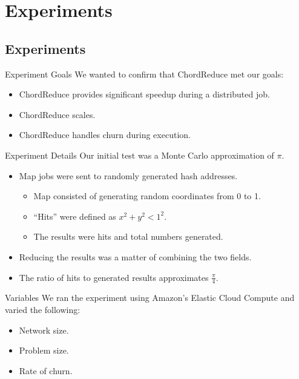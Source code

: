 \documentclass[11pt]{beamer}
\begin{document}
\section{Experiments}

\subsection{Experiments}
\begin{frame}{Experiment Goals}
We wanted to confirm that ChordReduce met our goals:

\begin{itemize}
    \item ChordReduce provides significant speedup during a distributed job.
    \item ChordReduce scales.
    \item ChordReduce handles churn during execution.
\end{itemize}

\end{frame}


\begin{frame}{Experiment Details}
Our initial test was a Monte Carlo approximation of $\pi$.

\begin{itemize}
	\item Map jobs were sent to randomly generated hash addresses.
	\begin{itemize}
		\item Map consisted of generating random coordinates from 0 to 1.
		\item ``Hits'' were defined as $x^{2} + y^{2} < 1^{2}$.
		\item The results were hits and total numbers generated.
	\end{itemize}
	\item Reducing the results was a matter of combining the two fields.
	\item The ratio of hits to generated results approximates $\frac{\pi}{4}$.
\end{itemize}

\end{frame}

\begin{frame}{Variables}
We ran the experiment using Amazon's Elastic Cloud Compute \cite{amazon-instances} and varied the following:
	\begin{itemize}
		\item Network size.
		\item Problem size.
		\item Rate of churn.
	\end{itemize}
\end{frame}
\end{document}

